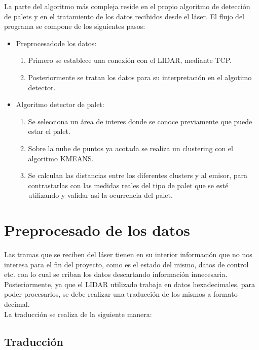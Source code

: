 
La parte del algoritmo más compleja reside en el propio algoritmo de detección de palets y en el tratamiento de los datos recibidos desde el láser.
El flujo del programa se compone de los siguientes pasos:
\begin{itemize}
	\item Preprocesadode los datos: \\
	\begin{enumerate}
		\item Primero se establece una conexión con el LIDAR, mediante TCP.
		\item Posteriormente se tratan los datos para su interpretación en el algotimo detector.
	\end{enumerate}
	\item Algoritmo detector de palet: \\
	\begin{enumerate}
		\item Se selecciona un área de interes donde se conoce previamente que puede estar el palet.
		\item Sobre la nube de puntos ya acotada se realiza un clustering con el algoritmo KMEANS.
		\item Se calculan las distancias entre los diferentes clusters y al emisor, para contrastarlas con las medidas reales del tipo de palet que se esté utilizando y validar así la ocurrencia del palet.

	\end{enumerate}
	\end{itemize}

\newpage
\section{Preprocesado de los datos}

Las tramas que se reciben del láser tienen en su interior información que no nos interesa para el fin del proyecto, como es el estado del mismo, datos de control etc. con lo cual se criban los datos descartando información innecesaria.\\


Posteriormente, ya que el LIDAR utilizado trabaja en datos hexadecimales, para poder procesarlos, se debe realizar una traducción de los mismos a formato decimal.\\
La traducción se realiza de la siguiente manera:\\
	\subsection{Traducción}

